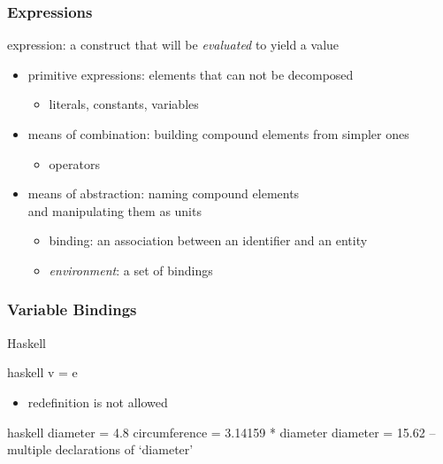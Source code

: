 \documentclass[dvipsnames]{beamer}
\theoremstyle{plain}
\begin{document}
\begin{frame}
  \frametitle{Expressions}

  \begin{definition}
    \alert{expression}: a construct that will be \emph{evaluated} to yield a value
  \end{definition}

  \pause
  \medskip
  \begin{itemize}
    \item primitive expressions: elements that can not be decomposed\\
    \begin{itemize}
      \item literals, constants, variables
    \end{itemize}
    \item means of combination: building compound elements from simpler ones\\
    \begin{itemize}
      \item operators
    \end{itemize}
    \item means of abstraction: naming compound elements\\
      and manipulating them as units
    \begin{itemize}
      \item \alert{binding}: an association between an identifier and an entity
      \item \emph{environment}: a set of bindings
    \end{itemize}
  \end{itemize}
\end{frame}

\begin{frame}[fragile]
  \frametitle{Variable Bindings}

  \begin{block}{Haskell}
    \begin{pygments}{haskell}
v = e
    \end{pygments}
  \end{block}

  \begin{itemize}
    \item redefinition is not allowed
  \end{itemize}

  \pause
  \bigskip
  \begin{example}
    \begin{pygments}{haskell}
diameter = 4.8
circumference = 3.14159 * diameter
diameter = 15.62  -- multiple declarations of `diameter'
    \end{pygments}
  \end{example}
\end{frame}
\end{document}
